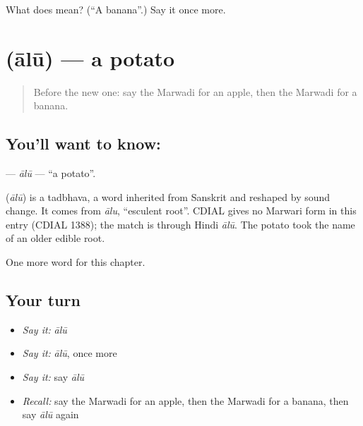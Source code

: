 \begin{tcolorbox}[breakable,colback=teal!4,colframe=teal!35!black,title={Before you move on}]
What does  mean? (\textquotedblleft{}A banana\textquotedblright{}.) Say it once more.
\end{tcolorbox}
\section[\texorpdfstring{\mw{आलू} (ālū)}{आलू (ālū)}]{ (ālū) — a potato}

\label{lesson:MW-C59-alu}



\begin{quote}
Before the new one: say the Marwadi for an apple, then the Marwadi for a banana.
\end{quote}

\subsection*{You'll want to know: }
\textbf{} — \emph{ālū} — \textquotedblleft{}a potato\textquotedblright{}.

\begin{cousinweb}
\textbf{} (\emph{ālū}) is a tadbhava, a word inherited from Sanskrit and reshaped by sound change. It comes from \emph{ālu}, \textquotedblleft{}esculent root\textquotedblright{}. CDIAL gives no Marwari form in this entry (CDIAL 1388); the match is through Hindi \emph{ālū}. The potato took the name of an older edible root.
\end{cousinweb}

\begin{grammarlens}[title={What you've built}]
One more word for this chapter.
\end{grammarlens}

\subsection*{Your turn}
\begin{itemize}
\raggedright
  \item \emph{Say it:} \emph{ālū}
  \item \emph{Say it:} \emph{ālū}, once more
  \item \emph{Say it:} say \emph{ālū}
  \item \emph{Recall:} say the Marwadi for an apple, then the Marwadi for a banana, then say \emph{ālū} again
\end{itemize}

